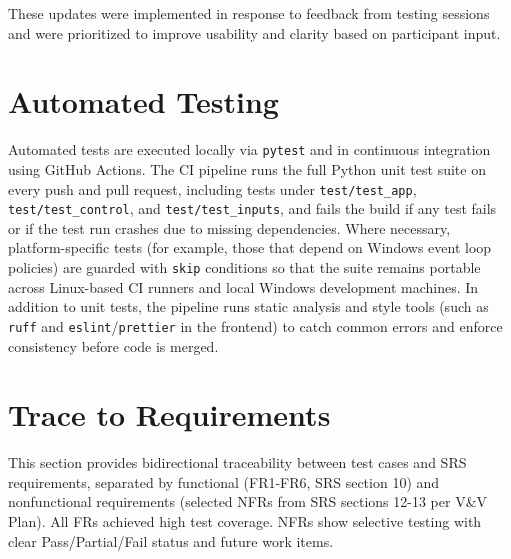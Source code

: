 \documentclass[12pt, titlepage]{article}
\begin{document}
These updates were implemented in response to feedback from testing sessions and were prioritized to improve usability and clarity based on participant input.

\section{Automated Testing}
		
Automated tests are executed locally via \texttt{pytest} and in continuous integration using GitHub Actions. The CI pipeline runs the full Python unit test suite on every push and pull request, including tests under \texttt{test/test\_app}, \texttt{test/test\_control}, and \texttt{test/test\_inputs}, and fails the build if any test fails or if the test run crashes due to missing dependencies. Where necessary, platform-specific tests (for example, those that depend on Windows event loop policies) are guarded with \texttt{skip} conditions so that the suite remains portable across Linux-based CI runners and local Windows development machines. In addition to unit tests, the pipeline runs static analysis and style tools (such as \texttt{ruff} and \texttt{eslint}/\texttt{prettier} in the frontend) to catch common errors and enforce consistency before code is merged.


\section{Trace to Requirements}

This section provides bidirectional traceability between test cases and SRS requirements, separated by functional (FR1-FR6, SRS section 10) and nonfunctional requirements (selected NFRs from SRS sections 12-13 per V\&V Plan). All FRs achieved high test coverage. NFRs show selective testing with clear Pass/Partial/Fail status and future work items.
\end{document}
